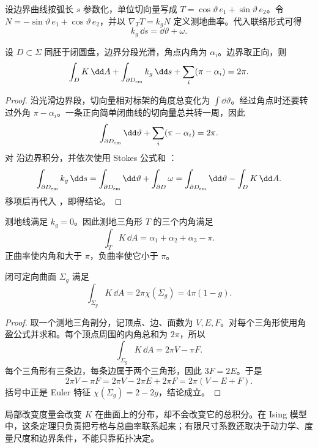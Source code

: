 设边界曲线按弧长 \(s\) 参数化，单位切向量写成
\(T=\cos\vartheta\,e_1+\sin\vartheta\,e_2\)。令
\(N=-\sin\vartheta\,e_1+\cos\vartheta\,e_2\)，并以
\(\nabla_TT=k_gN\) 定义测地曲率。代入联络形式可得
\begin{equation}
k_g\,\dd s=\dd\vartheta+\omega.
\label{eq:geodesic-curvature-turning}
\end{equation}

\begin{theorem}
设 \(D\subset\Sigma\) 同胚于闭圆盘，边界分段光滑，角点内角为
\(\alpha_i\)。边界取正向，则
\begin{equation}
\int_DK\,\dd A
+\int_{\partial D_{\rm sm}}k_g\,\dd s
+\sum_i(\pi-\alpha_i)=2\pi.
\label{eq:local-gauss-bonnet-corners}
\end{equation}
\end{theorem}

\begin{proof}
沿光滑边界段，切向量相对标架的角度总变化为
\(\int\dd\vartheta\)。经过角点时还要转过外角
\(\pi-\alpha_i\)。一条正向简单闭曲线的切向量总共转一周，因此
\begin{equation}
\int_{\partial D_{\rm sm}}\dd\vartheta
+\sum_i(\pi-\alpha_i)=2\pi.
\label{eq:boundary-total-turning}
\end{equation}
对  沿边界积分，并依次使用 Stokes 公式和
：
\[
\int_{\partial D_{\rm sm}}k_g\,\dd s
=\int_{\partial D_{\rm sm}}\dd\vartheta
+\int_{\partial D}\omega
=\int_{\partial D_{\rm sm}}\dd\vartheta
-\int_DK\,\dd A.
\]
移项后再代入 ，即得结论。
\end{proof}

测地线满足 \(k_g=0\)。因此测地三角形 \(T\) 的三个内角满足
\begin{equation}
\int_TK\,\dd A
=\alpha_1+\alpha_2+\alpha_3-\pi.
\label{eq:geodesic-triangle-angle-excess}
\end{equation}
正曲率使内角和大于 \(\pi\)，负曲率使它小于 \(\pi\)。

\begin{theorem}
闭可定向曲面 \(\Sigma_g\) 满足
\begin{equation}
\int_{\Sigma_g}K\,\dd A
=2\pi\chi(\Sigma_g)
=4\pi(1-g).
\label{eq:phys-sm-gauss-bonnet}
\end{equation}
\end{theorem}

\begin{proof}
取一个测地三角剖分，记顶点、边、面数为 \(V,E,F\)。对每个三角形使用角盈公式并求和。每个顶点周围的内角总和为 \(2\pi\)，所以
\[
\int_{\Sigma_g}K\,\dd A=2\pi V-\pi F.
\]
每个三角形有三条边，每条边属于两个三角形，因此
\(3F=2E\)。于是
\[
2\pi V-\pi F
=2\pi V-2\pi E+2\pi F
=2\pi(V-E+F).
\]
括号中正是 Euler 特征 \(\chi(\Sigma_g)=2-2g\)，结论成立。
\end{proof}

局部改变度量会改变 \(K\) 在曲面上的分布，却不会改变它的总积分。在 Ising 模型中，这条定理只负责把亏格与总曲率联系起来；有限尺寸系数还取决于动力学、度量尺度和边界条件，不能只靠拓扑决定。
